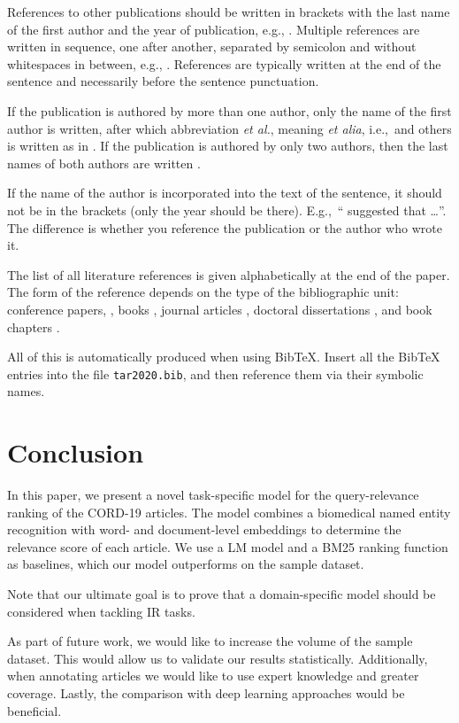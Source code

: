 \documentclass[10pt, a4paper]{article}
\begin{document}
References to other publications should be written in brackets with the last name of the first author and the year of publication, e.g., \citep{chomsky-73}.  Multiple references are written in sequence, one after another, separated by semicolon and without whitespaces in between, e.g., \citep{chomsky-73,chave-64,feigl-58}. References are typically written at the end of the sentence and necessarily before the sentence punctuation.

If the publication is authored by more than one author, only the name of the first author is written, after which abbreviation \emph{et al.}, meaning \emph{et alia}, i.e.,~and others is written as in \citep{johnson-etc}. If the publication is authored by only two authors, then the last names of both authors are written \citep{johnson-howells}.

If the name of the author is incorporated into the text of the sentence, it should not be in the brackets (only the year should be there). E.g.,~``\citet{chomsky-73}
suggested that \dots''. The difference is whether you reference the publication or the author who wrote it.

The list of all literature references is given alphabetically at the end of the paper. The form of the reference depends on the type of the bibliographic unit: conference papers,
\citep{chave-64}, books \citep{butcher-81}, journal articles
\citep{howells-51}, doctoral dissertations \citep{croft-78}, and book chapters \citep{feigl-58}.

All of this is automatically produced when using BibTeX. Insert all the BibTeX entries into the file \texttt{tar2020.bib}, and then reference them via their symbolic names.

\section{Conclusion}

In this paper, we present a novel task-specific model for the query-relevance ranking of the CORD-19 articles. The model combines a biomedical named entity recognition with word- and document-level embeddings to determine the relevance score of each article. We use a LM model and a BM25 ranking function as baselines, which our model outperforms on the sample dataset.

Note that our ultimate goal is to prove that a domain-specific model should be considered when tackling IR tasks.

As part of future work, we would like to increase the volume of the sample dataset. This would allow us to validate our results statistically. Additionally, when annotating articles we would like to use expert knowledge and greater coverage. Lastly, the comparison with deep learning approaches would be beneficial.
\end{document}
